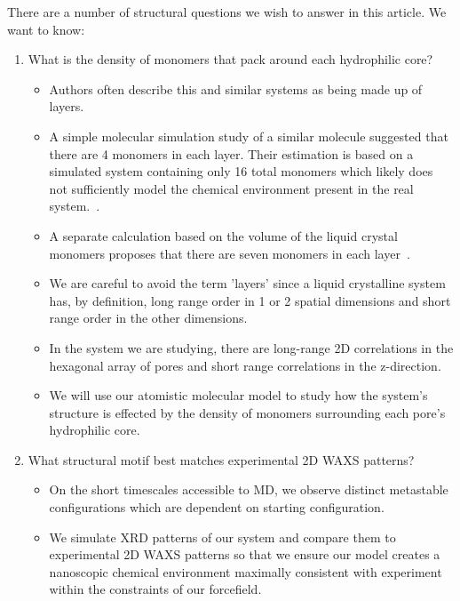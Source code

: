 \documentclass{article}
\begin{document}
  There are a number of structural questions we wish to answer in this article. We
  want to know:
  \begin{enumerate}
    \item What is the density of monomers that pack around each hydrophilic core? 
    \label{point:monomernum}
 	\begin{itemize}
 		\item Authors often describe this and similar systems as being made up of layers.
 		\item A simple molecular simulation study of a similar molecule suggested
	    that there are 4 monomers in each layer. Their estimation is based on a
	    simulated system containing only 16 total monomers which likely does not sufficiently
	    model the chemical environment present in the real system.~\cite{zhu_methacrylated_2006}. 
	    \item A separate calculation based on the volume of the liquid crystal monomers proposes
	    that there are seven monomers in each layer~\cite{resel_structural_2000}. 
 		\item We are careful to avoid the term 'layers' since a liquid crystalline system has,
 		by definition, long range order in 1 or 2 spatial dimensions and short range order in 	
 		the other dimensions.~\cite{chaikin_principles_1995}  %
 		\item In the system we are studying, there are long-range 2D correlations in the 
 		hexagonal array of pores and short range correlations in the z-direction.
		\item We will use our atomistic molecular model to study how the system's structure is
		effected by the density of monomers surrounding each pore's hydrophilic core. 
	\end{itemize}
	\item What structural motif best matches experimental 2D WAXS patterns?\label{point:xrdmatch}
	\begin{itemize}
		\item On the short timescales accessible to MD, we observe distinct metastable 
		configurations which are dependent on starting configuration.
		\item We simulate XRD patterns of our system and compare them to experimental 2D WAXS 
		patterns so that we ensure our model creates a nanoscopic chemical environment maximally
		consistent with experiment within the constraints of our forcefield.

\end{itemize}
\end{enumerate}
\end{document}
